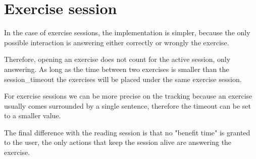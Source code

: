 \section{Exercise session}
In the case of exercise sessions, the implementation is simpler, because the only possible interaction is answering either correctly or wrongly the exercise. 

Therefore, opening an exercise does not count for the active session, only answering. As long as the time between two exercises is smaller than the session\_timeout the exercises will be placed under the same exercise session.

For exercise sessions we can be more precise on the tracking because an exercise usually comes surrounded by a single sentence, therefore the timeout can be set to a smaller value. 

The final difference with the reading session is that no "benefit time" is granted to the user, the only actions that keep the session alive are answering the exercise.







